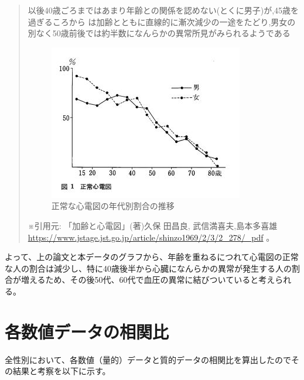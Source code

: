 \documentclass[dvipdfmx]{jsarticle}
\begin{document}
        \begin{quote}
            以後40歳ごろまではあまり年齢との関係を認めない(とくに男子)が,45歳を過ぎるころから
            は加齢とともに直線的に漸次減少の一途をたどり,男女の別なく50歳前後では約半数になんらかの異常所見がみられるようである
            \begin{figure}[H]
                \centering
                    \includegraphics[scale=0.9]{images/allgender/cap.png}
                    \caption{正常な心電図の年代別割合の推移}
            \end{figure}
            ※引用元: 「加齢と心電図」(著)久保 田昌良, 武信満喜夫,島本多喜雄 \url{https://www.jstage.jst.go.jp/article/shinzo1969/2/3/2_278/_pdf} 。
        \end{quote}
        よって、上の論文と本データのグラフから、年齢を重ねるにつれて心電図の正常な人の割合は減少し、特に40歳後半から心臓になんらかの異常が発生する人の割合が増えるため、その後50代、60代で血圧の異常に結びついていると考えられる。
        
\section{各数値データの相関比}
    全性別において、各数値（量的）データと質的データの相関比を算出したのでその結果と考察を以下に示す。
\end{document}
